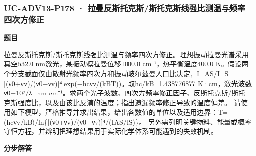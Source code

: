 \documentclass[UTF8,11pt,a4paper]{ctexart}
\begin{document}
\subsubsection*{UC-ADV13-P178 · 拉曼反斯托克斯/斯托克斯线强比测温与频率四次方修正}
\noindent\textbf{题目}\par
拉曼反斯托克斯/斯托克斯线强比测温与频率四次方修正。理想振动拉曼光谱采用真空532.0 nm激光，某振动模拉曼位移1000.0 cm⁻¹，热平衡温度400.0 K。假设两个分支截面仅由散射光频率四次方和振动玻尔兹曼人口比决定，I\_AS/I\_S=[(ν0+νv)/(ν0−νv)]⁴ exp(−hcνv/(kBT))。取hc/kB=1.438776877 K·cm，激光波数ν0=10⁷/λ\_nm cm⁻¹。求两个光子波数、四次方频率修正因子、反斯托克斯/斯托克斯强度比，以及由该比反演的温度；指出遗漏频率修正导致的温度偏差。 请使用如下模型，严格推导并求出结果，给出各数值的单位以及适用边界：T=(hcνv/kB)/ln\{[(ν0+νv)/(ν0−νv)]⁴/(IAS/IS)\}。 另外需列明关键物料、能量或概率守恒方程，并辨明把理想结果用于实际化学体系可能遇到的失效机制。\par
\medskip\noindent\textbf{分步解答}
\end{document}
